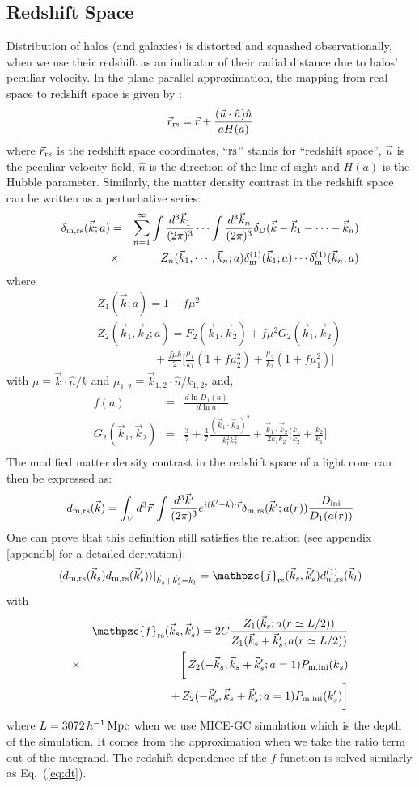 \documentclass[prd,amsmath,amssymb,floatfix,superscriptaddress,nofootinbib,twocolumn]{revtex4-1}
\def\be{\begin{equation}}
\def\ee{\end{equation}}
\def\bea{\begin{eqnarray}}
\def\eea{\end{eqnarray}}
\newcommand{\m}{\rm m}
\newcommand{\rs}{\rm rs}
\newcommand{\ini}{\rm ini}
\newcommand{\vrr}{\vec{r}}
\newcommand{\vs}{\nonumber\\}
\newcommand{\vk}{\vec{k}}
\newcommand{\ec}[1]{Eq.~(\ref{eq:#1})}
\newcommand{\eql}[1]{\label{eq:#1}}
\begin{document}
\subsection{Redshift Space} \label{sec7}
Distribution of halos (and galaxies) is distorted and squashed observationally, when we use their redshift as an indicator of their radial distance due to halos' peculiar velocity. In the plane-parallel approximation, the mapping from real space to redshift space is given by \cite{Bernardeau:2002rev}:
\be 
\vrr_{\rs} = \vrr + \frac{(\vec{u}\cdot \hat{n})\hat{n}}{aH(a)}
\ee 
where $\vrr_{\rs}$ is the redshift space coordinates, ``$\rs$'' stands for ``redshift space'', $\vec{u}$ is the peculiar velocity field, $\hat{n}$ is the direction of the line of sight and $H(a)$ is the Hubble parameter. Similarly, the matter density contrast in the redshift space can be written as a perturbative series:
\bea 
\delta_{\m,\rs}(\vk;a)&=&\sum_{n=1}^{\infty} \int\frac{d^3 \vk_1}{(2\pi)^3} \cdots \int \frac{d^3 \vk_n}{(2\pi)^3} \delta_{\rm D}(\vk-\vk_1 - \cdots -\vk_n) \nonumber \\
&\times & Z_n (\vk_1,\cdots,\vk_n;a)\delta_{\m}^{(1)}(\vk_1;a)\cdots \delta_{\m}^{(1)}(\vk_n;a) \eql{rspt} \vs
\eea
where 
\bea 
&&Z_1(\vk;a)=1+f\mu^2 \\ 
&&Z_2(\vk_1,\vk_2;a)=F_{2}(\vk_1,\vk_2)+f\mu^2 G_2(\vk_1,\vk_2)\vs 
&&\qquad \qquad\quad+\frac{f\mu k}{2}\bigg[ \frac{\mu_1}{k_1}(1+f\mu_2^2)+\frac{\mu_2}{k_2}(1+f\mu_1^2)\bigg]
\eea 
with $\mu \equiv \vk \cdot \hat{n}/k$ and $\mu_{1,2} \equiv \vk_{1,2} \cdot \hat{n}/k_{1,2}$, and,
\bea 
f(a)&\equiv & \frac{d \ln D_{1}(a)}{d \ln a}\\
G_2(\vk_1,\vk_2)&=&\frac{3}{7}+\frac{4}{7}\frac{(\vk_1\cdot \vk_2)^2}{k_1^2 k_2^2}+\frac{\vk_1\cdot \vk_2}{2k_1k_2}\bigg[\frac{k_1}{k_2}+\frac{k_2}{k_1}\bigg]\vs
\eea 
The modified matter density contrast in the redshift space of a light cone can then be expressed as: 
\be 
d_{\rm m,\rs}(\vk)=\int_{V} d^3\vrr  \, \int \frac{d^3 \vk'}{(2\pi)^3}e^{i(\vk'-\vk)\cdot\vrr}\delta_{\rm m,\rs}(\vk';a(r))\frac{D_{\ini}}{D_{1}(a(r))} 
\ee 
One can prove that this definition still satisfies the relation (see appendix \ref{appendb} for a detailed derivation):
\be 
\langle d_{\rm m,\rs }(\vk_s)d_{\rm m,\rs }(\vk_s') \rangle|_{\vk_s+\vk_s'=\vk_l} =\mathpzc{f}_{\rs}(\vec{k}_s,\vec{k}_s'){d}^{(1)}_{\rm m,\rs}(\vec{k}_l) \eql{2ptddrs}
\ee 
with 
\bea
&&\mathpzc{f}_{\rs}(\vec{k}_s,\vec{k}_s')=2C\frac{Z_{1}(\vk_s;a(r\simeq L/2 ))}{Z_{1}(\vk_s+\vk_s';a(r\simeq L/2 ))}\vs
&\times&\bigg[\,Z_2(-\vec{k}_s,\vec{k}_s+\vec{k}_s';a=1)P_{\rm m,ini}(k_s)\vs
&&+\,Z_2(-\vec{k}_s',\vec{k}_s+\vec{k}_s';a=1)P_{\rm m,ini}(k_s')\bigg]  \vs   
\eea 
where $L=3072\, h^{-1}\, \rm Mpc$ when we use MICE-GC simulation which is the depth of the simulation. It comes from the approximation when we take the ratio term out of the integrand. The redshift dependence of the $f$ function is solved similarly as \ec{dt}. 
\end{document}
